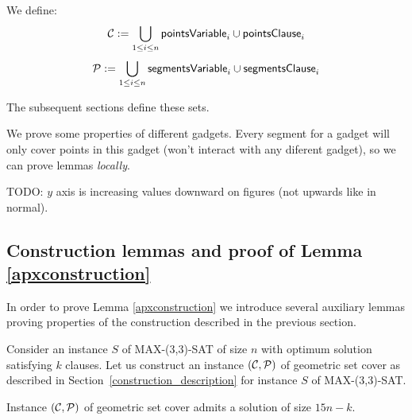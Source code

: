We define:
$$\mathcal{C} := \bigcup_{1 \le i \le n} \mathsf{pointsVariable}_{i} \cup \mathsf{pointsClause}_i $$
$$\mathcal{P} := \bigcup_{1 \le i \le n} \mathsf{segmentsVariable}_{i} \cup \mathsf{segmentsClause}_i $$

The subsequent sections define these sets.

We prove some properties of different gadgets.
Every segment for a gadget will only cover points 
in this gadget (won't interact with any diferent gadget),
so we can prove lemmas \textit{locally}.


TODO: $y$ axis is increasing values downward on figures
(not upwards like in normal).


\subsection{Construction lemmas and proof of Lemma \ref{apxconstruction}}
\newcommand{\setCoverInstance}{(\points, \sets)}
\newcommand{\true}{\texttt{true}}
\newcommand{\false}{\texttt{false}}

In order to prove Lemma \ref{apxconstruction} we introduce several
auxiliary lemmas proving properties of the construction
described in the previous section.

Consider an instance $S$ of MAX-(3,3)-SAT of size $n$
with optimum solution satisfying $k$ clauses.
Let us construct an instance $\setCoverInstance$ of geometric set cover
as described in Section~\ref{construction_description}
for instance $S$ of MAX-(3,3)-SAT.

\begin{lemma}
	\label{construction_correctness}
	Instance $\setCoverInstance$ of geometric set cover
	admits a solution of size $15n - k$.
\end{lemma}

